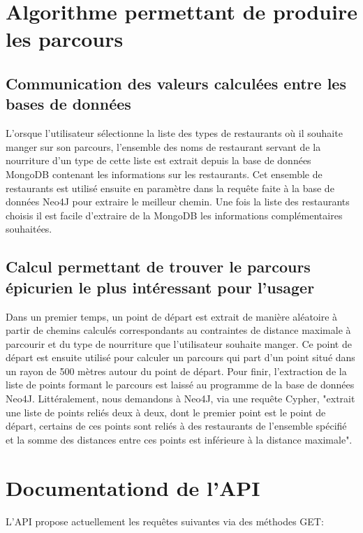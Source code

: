\documentclass[12pt]{article}
\begin{document}
\section{Algorithme permettant de produire les parcours}

\subsection{Communication des valeurs calculées entre les bases de données}

    L'orsque l'utilisateur sélectionne la liste des types de restaurants où il souhaite manger sur son parcours, l'ensemble des noms de restaurant servant de la nourriture d'un type de cette liste est extrait depuis la base de données MongoDB contenant les informations sur les restaurants. Cet ensemble de restaurants est utilisé ensuite en paramètre dans la requête faite à la base de données Neo4J pour extraire le meilleur chemin.
    Une fois la liste des restaurants choisis il est facile d'extraire de la MongoDB les informations complémentaires souhaitées.

\subsection{Calcul permettant de trouver le parcours épicurien le plus intéressant pour l'usager}

    Dans un premier temps, un point de départ est extrait de manière aléatoire à partir de chemins calculés correspondants au contraintes de distance maximale à parcourir et du type de nourriture que l'utilisateur souhaite manger.
    Ce point de départ est ensuite utilisé pour calculer un parcours qui part d'un point situé dans un rayon de 500 mètres autour du point de départ. Pour finir, l'extraction de la liste de points formant le parcours est laissé au programme de la base de données Neo4J. Littéralement, nous demandons à Neo4J, via une requête Cypher, "extrait une liste de points reliés deux à deux, dont le premier point est le point de départ, certains de ces points sont reliés à des restaurants de l'ensemble spécifié et la somme des distances entre ces points est inférieure à la distance maximale".  

\section{Documentationd de l'API}

    L'API propose actuellement les requêtes suivantes via des méthodes GET:
\end{document}
